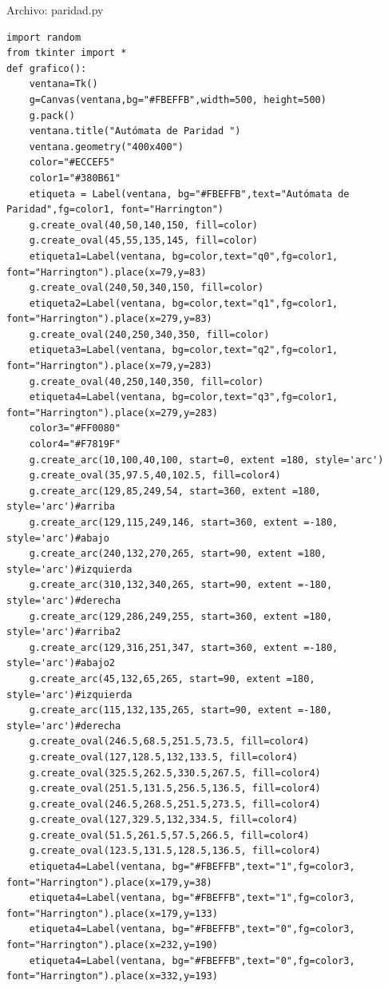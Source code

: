 \documentclass[12pt]{article}
\begin{document}
Archivo: paridad.py
\lstset{language=Python, breaklines=true, basicstyle=\footnotesize}
\begin{lstlisting}[frame=single]
import random 
from tkinter import *
def grafico():
	ventana=Tk()
	g=Canvas(ventana,bg="#FBEFFB",width=500, height=500)
	g.pack()
	ventana.title("Autómata de Paridad ")
	ventana.geometry("400x400")
	color="#ECCEF5"
	color1="#380B61"
	etiqueta = Label(ventana, bg="#FBEFFB",text="Autómata de Paridad",fg=color1, font="Harrington")
	g.create_oval(40,50,140,150, fill=color)
	g.create_oval(45,55,135,145, fill=color)
	etiqueta1=Label(ventana, bg=color,text="q0",fg=color1, font="Harrington").place(x=79,y=83)
	g.create_oval(240,50,340,150, fill=color)
	etiqueta2=Label(ventana, bg=color,text="q1",fg=color1, font="Harrington").place(x=279,y=83)
	g.create_oval(240,250,340,350, fill=color)
	etiqueta3=Label(ventana, bg=color,text="q2",fg=color1, font="Harrington").place(x=79,y=283)
	g.create_oval(40,250,140,350, fill=color)
	etiqueta4=Label(ventana, bg=color,text="q3",fg=color1, font="Harrington").place(x=279,y=283)
	color3="#FF0080"
	color4="#F7819F"
	g.create_arc(10,100,40,100, start=0, extent =180, style='arc')
	g.create_oval(35,97.5,40,102.5, fill=color4)
	g.create_arc(129,85,249,54, start=360, extent =180, style='arc')#arriba
	g.create_arc(129,115,249,146, start=360, extent =-180, style='arc')#abajo
	g.create_arc(240,132,270,265, start=90, extent =180, style='arc')#izquierda
	g.create_arc(310,132,340,265, start=90, extent =-180, style='arc')#derecha
	g.create_arc(129,286,249,255, start=360, extent =180, style='arc')#arriba2
	g.create_arc(129,316,251,347, start=360, extent =-180, style='arc')#abajo2
	g.create_arc(45,132,65,265, start=90, extent =180, style='arc')#izquierda
	g.create_arc(115,132,135,265, start=90, extent =-180, style='arc')#derecha
	g.create_oval(246.5,68.5,251.5,73.5, fill=color4)
	g.create_oval(127,128.5,132,133.5, fill=color4)
	g.create_oval(325.5,262.5,330.5,267.5, fill=color4)
	g.create_oval(251.5,131.5,256.5,136.5, fill=color4)
	g.create_oval(246.5,268.5,251.5,273.5, fill=color4)
	g.create_oval(127,329.5,132,334.5, fill=color4)
	g.create_oval(51.5,261.5,57.5,266.5, fill=color4)
	g.create_oval(123.5,131.5,128.5,136.5, fill=color4)
	etiqueta4=Label(ventana, bg="#FBEFFB",text="1",fg=color3, font="Harrington").place(x=179,y=38)
	etiqueta4=Label(ventana, bg="#FBEFFB",text="1",fg=color3, font="Harrington").place(x=179,y=133)
	etiqueta4=Label(ventana, bg="#FBEFFB",text="0",fg=color3, font="Harrington").place(x=232,y=190)
	etiqueta4=Label(ventana, bg="#FBEFFB",text="0",fg=color3, font="Harrington").place(x=332,y=193)

\end{lstlisting}
\end{document}

